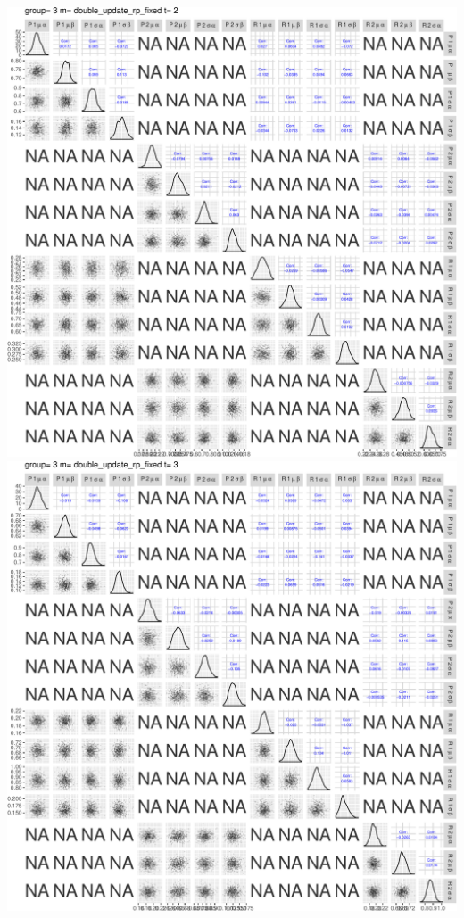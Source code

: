 \documentclass[]{article}
\begin{document}
\includegraphics{compare_models_files/figure-latex/PairsPlots-17.pdf}
\includegraphics{compare_models_files/figure-latex/PairsPlots-18.pdf}
\end{document}
